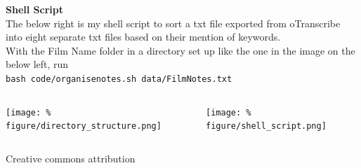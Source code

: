 \documentclass[unknownkeysallowed,usepdftitle=false, parskip=full]{beamer}
\newcommand{\secvariable}{nothing}
\newcommand{\mysection}[1]{\renewcommand{\secvariable}{#1}
}
\begin{document}
\mysection{line}
\begin{frame}\label{\secvariable}
\begin{center}
  \vspace{-0.5cm}
\textbf{Shell Script}\\
\vspace{2pt}
\footnotesize{The below right is my shell script to sort a txt file exported from oTranscribe into eight separate txt files based on their mention of keywords.\\
With the Film Name folder in a directory set up like the one in the image on the below left, run} \\
\texttt{bash code/organise\textunderscore notes.sh data/Film\textunderscore Notes.txt}

\end{center}

 \begin{columns}[t]
  
      \begin{column}[c]{0.45\textwidth}

\texttt{[image: \%
figure/directory\_structure.png]}

    \end{column}
  
  \begin{column}[c]{0.45\textwidth}

\texttt{[image: \%
figure/shell\_script.png]}



    \end{column}
    
    
  \end{columns}

\begin{center}
Creative commons attribution    
\end{center}

  
\end{frame}
\end{document}
